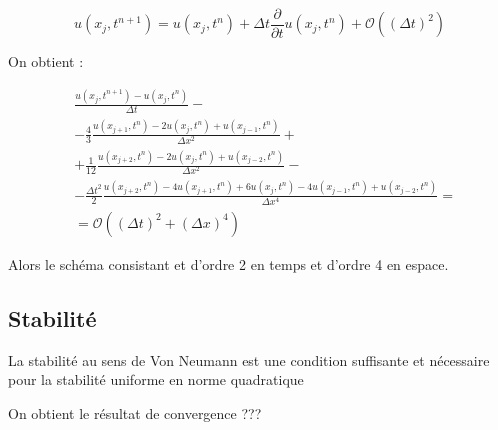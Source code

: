 \documentclass[a4paper,11pt]{article}
\begin{document}
\begin{equation*}
    u(x_{j}, t^{n+1}) =
    u(x_{j}, t^{n})    
     + \Delta t \frac{\partial}{\partial t}u(x_{j}, t^{n})
     + \mathcal{O}((\Delta t)^{2})
\end{equation*}

On obtient :

\begin{align*}
    & \frac{u(x_{j}, t^{n+1}) - u(x_{j}, t^{n})}{\Delta t} - \\
    & -\frac{4}{3} \frac{u(x_{j+1}, t^{n}) - 2u(x_{j}, t^{n}) + u(x_{j-1}, t^{n})}{\Delta x^{2}} + \\
    & +\frac{1}{12} \frac{u(x_{j+2}, t^{n}) - 2u(x_{j}, t^{n}) + u(x_{j-2}, t^{n})}{\Delta x^{2}} - \\
    & -\frac{\Delta t^{2}}{2} \frac{u(x_{j+2}, t^{n}) - 4u(x_{j+1}, t^{n}) + 6u(x_{j}, t^{n})  - 4u(x_{j-1}, t^{n}) + u(x_{j-2}, t^{n})}{\Delta x^{4}} = \\
   & = \mathcal{O}((\Delta t)^{2} + (\Delta x)^{4})
\end{align*}

Alors le schéma consistant et d'ordre 2 en temps et d'ordre 4 en espace.

\subsection{Stabilité}
La stabilité au sens de Von Neumann est une condition suffisante et nécessaire pour la stabilité uniforme en norme quadratique

On obtient le résultat de convergence ???

\subsection{}
\end{document}
